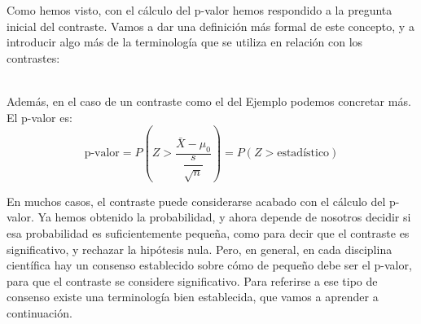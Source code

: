 Como hemos visto, con el cálculo del p-valor hemos respondido a la pregunta inicial del contraste. Vamos a dar una definición más formal de este concepto, y a introducir algo más de la terminología que se utiliza en relación con los contrastes:
    \begin{center}
    \end{center}
\quad\\[5mm]

Además, en el caso de un contraste como el del Ejemplo podemos concretar más. El p-valor es:
\begin{equation}\label{cap07:ecu:pValorMediaZColaDerecha}
\mbox{p-valor}=P\left(Z > \dfrac{\bar X-\mu_0}{\dfrac{s}{\sqrt{n}}}\right)=
P\left(Z > \mbox{estadístico}\right)
\end{equation}


En muchos casos, el contraste puede considerarse acabado con el cálculo del p-valor. Ya hemos obtenido la probabilidad, y ahora depende de nosotros decidir si esa probabilidad es suficientemente pequeña, como para decir que el contraste es significativo, y rechazar la hipótesis nula. Pero, en general, en cada disciplina científica hay un consenso establecido sobre cómo de pequeño debe ser el p-valor, para que el contraste se considere significativo. Para referirse a ese tipo de consenso existe una terminología bien establecida, que vamos a aprender a continuación.

